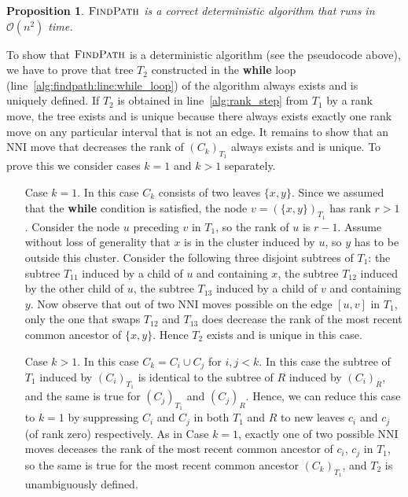 \documentclass[11pt]{amsart}
\newtheorem{proposition}{Proposition}
\newcommand{\findpath}{\textsc{FindPath}}
\newcommand{\nni}{\mathrm{NNI}}
\renewcommand{\O}{\mathcal O}
\begin{document}
\begin{proposition}
$\findpath$ is a correct deterministic algorithm that runs in $\O(n^2)$ time.
\label{prop:fp_correctness}
\end{proposition}

\proof
To show that $\findpath$ is a deterministic algorithm (see the pseudocode above), we have to prove that tree $T_2$ constructed in the \textbf{while} loop (line~\ref{alg:findpath:line:while_loop}) of the algorithm always exists and is uniquely defined.
If $T_2$ is obtained in line~\ref{alg:rank_step} from $T_1$ by a rank move, the tree exists and is unique because there always exists exactly one rank move on any particular interval that is not an edge.
It remains to show that an $\nni$ move that decreases the rank of $(C_k)_{T_1}$ always exists and is unique.
To prove this we consider cases $k = 1$ and $k > 1$ separately.

\begin{itemize}
\item[Case $k = 1$.]
In this case $C_k$ consists of two leaves $\{x, y\}$.
Since we assumed that the \textbf{while} condition is satisfied, the node $v = (\{x, y\})_{T_1}$ has rank $r > 1$.
Consider the node $u$ preceding $v$ in $T_1$, so the rank of $u$ is $r - 1$.
Assume without loss of generality that $x$ is in the cluster induced by $u$, so $y$ has to be outside this cluster.
Consider the following three disjoint subtrees of $T_1$: the subtree $T_{11}$ induced by a child of $u$ and containing $x$, the subtree $T_{12}$ induced by the other child of $u$, the subtree $T_{13}$ induced by a child of $v$ and containing $y$.
Now observe that out of two $\nni$ moves possible on the edge $[u, v]$ in $T_1$, only the one that swaps $T_{12}$ and $T_{13}$ does decrease the rank of the most recent common ancestor of $\{x, y\}$.
Hence $T_2$ exists and is unique in this case.

\item[Case $k > 1$.]
In this case $C_k = C_i \cup C_j$ for $i, j < k$.
In this case the subtree of $T_1$ induced by $(C_i)_{T_1}$ is identical to the subtree of $R$ induced by $(C_i)_R$, and the same is true for $(C_j)_{T_1}$ and $(C_j)_R$.
Hence, we can reduce this case to $k = 1$ by suppressing $C_i$ and $C_j$ in both $T_1$ and $R$ to new leaves $c_i$ and $c_j$ (of rank zero) respectively.
As in Case $k = 1$, exactly one of two possible $\nni$ moves deceases the rank of the most recent common ancestor of $c_i$, $c_j$ in $T_1$, so the same is true for the most recent common ancestor $(C_k)_{T_1}$, and $T_2$ is unambiguously defined.
\end{itemize}
\end{document}
